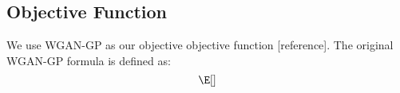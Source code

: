 \subsection{Objective Function}
We use WGAN-GP as our objective objective function [reference]. The original WGAN-GP formula is defined as:
\begin{equation}
\E[]
\end{equation}